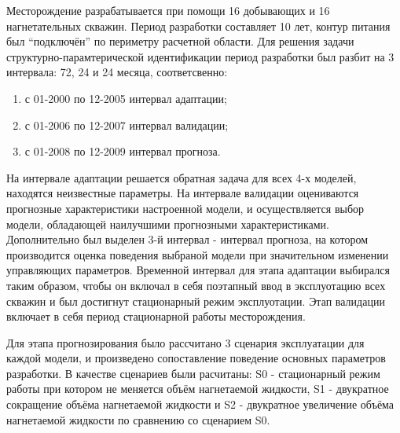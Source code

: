 \documentclass{article}
\begin{document}
Месторождение разрабатывается при помощи 16 добывающих и 16 нагнетательных скважин. Период разработки составляет 10 лет, контур питания был “подключён” по периметру расчетной области. Для решения задачи структурно-парамтерической идентификации период разработки был разбит на 3 интервала: 72, 24 и 24 месяца, соответсвенно:
\begin{enumerate}
\item с 01-2000 по 12-2005  интервал адаптации;
\item с 01-2006 по 12-2007  интервал валидации;
\item с 01-2008 по 12-2009  интервал прогноза.
\end{enumerate}

На интервале адаптации решается обратная задача для всех 4-х моделей, находятся неизвестные параметры. На интервале валидации оцениваются прогнозные характеристики настроенной модели, и осуществляется выбор модели, обладающей наилучшими прогнозными характеристиками. Дополнительно был выделен 3-й интервал - интервал прогноза, на котором производится оценка поведения выбраной модели при значительном изменении управляющих параметров. Временной интервал для этапа адаптации выбирался таким образом, чтобы он включал в себя поэтапный ввод в эксплуотацию всех скважин и был достигнут стационарный режим эксплуотации. Этап валидации включает в себя период стационарной работы месторождения. 

Для этапа прогнозирования было рассчитано 3 сценария эксплуатации для каждой модели, и произведено сопоставление поведение основных параметров разработки. В качестве сценариев были расчитаны: S0 - стационарный режим работы при котором не меняется объём нагнетаемой жидкости, S1 - двукратное сокращение объёма нагнетаемой жидкости и S2 - двукратное увеличение объёма нагнетаемой жидкости по сравнению со сценарием S0. 
\end{document}
